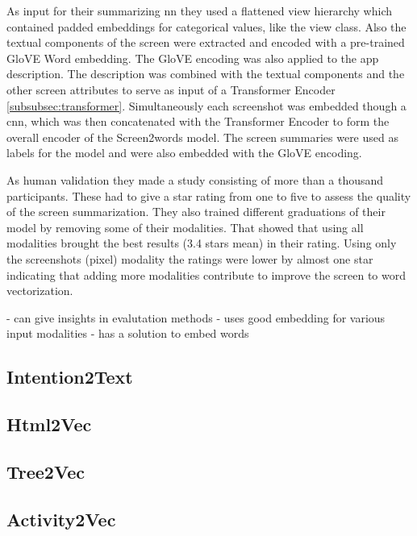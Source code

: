 As input for their summarizing \gls{nn} they used a flattened view hierarchy which contained padded embeddings for categorical values, like the view class.
Also the textual components of the screen were extracted and encoded with a pre-trained GloVE Word embedding.
The GloVE encoding was also applied to the app description.
The description was combined with the textual components and the other screen attributes to serve as input of a Transformer Encoder \ref{subsubsec:transformer}.
Simultaneously each screenshot was embedded though a \gls{cnn}, which was then concatenated with the Transformer Encoder to form the overall encoder of the Screen2words model.
The screen summaries were used as labels for the model and were also embedded with the GloVE encoding.

As human validation they made a study consisting of more than a thousand participants.
These had to give a star rating from one to five to assess the quality of the screen summarization.
They also trained different graduations of their model by removing some of their modalities.
That showed that using all modalities brought the best results (3.4 stars mean) in their rating.
Using only the screenshots (pixel) modality the ratings were lower by almost one star indicating that adding more modalities contribute to improve the screen to word vectorization.

- can give insights in evalutation methods
- uses good embedding for various input modalities
- has a solution to embed words

\subsection{Intention2Text}
\cite{yu2020understanding}

\subsection{Html2Vec}
\cite{wu2022distributed}

\subsection{Tree2Vec}

\subsection{Activity2Vec}

